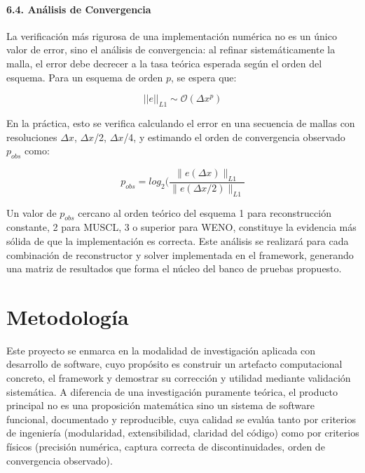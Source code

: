 \documentclass[11pt,openany]{book}
\begin{document}
\subsubsection{6.4. Análisis de Convergencia}\textbf{}

La verificación más rigurosa de una implementación numérica no es un único valor de error, sino el análisis de convergencia: al refinar sistemáticamente la malla, el error debe decrecer a la tasa teórica esperada según el orden del esquema. Para un esquema de orden $p$, se espera que:

\begin{equation}
    \lvert\lvert e \rvert\rvert_{L1} \sim \mathcal{O}(\Delta x^p)
\end{equation}

En la práctica, esto se verifica calculando el error en una secuencia de mallas con resoluciones $\Delta x$, $\Delta x$/2, $\Delta x$/4, y estimando el orden de convergencia observado $p_{obs}$ como:

\begin{equation}
    p_{obs} = log_{2}(\frac{\parallel e(\Delta x)\parallel_{L1}}{\parallel e(\Delta x/2)\parallel_{L1}}
\end{equation}

Un valor de $p_{obs}$ cercano al orden teórico del esquema 1 para reconstrucción constante, 2 para MUSCL, 3 o superior para WENO, constituye la evidencia más sólida de que la implementación es correcta. Este análisis se realizará para cada combinación de reconstructor y solver implementada en el framework, generando una matriz de resultados que forma el núcleo del banco de pruebas propuesto.

\clearpage

\chapter{Metodología}

Este proyecto se enmarca en la modalidad de investigación aplicada con desarrollo de software, cuyo propósito es construir un artefacto computacional concreto, el framework y demostrar su corrección y utilidad mediante validación sistemática. A diferencia de una investigación puramente teórica, el producto principal no es una proposición matemática sino un sistema de software funcional, documentado y reproducible, cuya calidad se evalúa tanto por criterios de ingeniería (modularidad, extensibilidad, claridad del código) como por criterios físicos (precisión numérica, captura correcta de discontinuidades, orden de convergencia observado).
\end{document}
